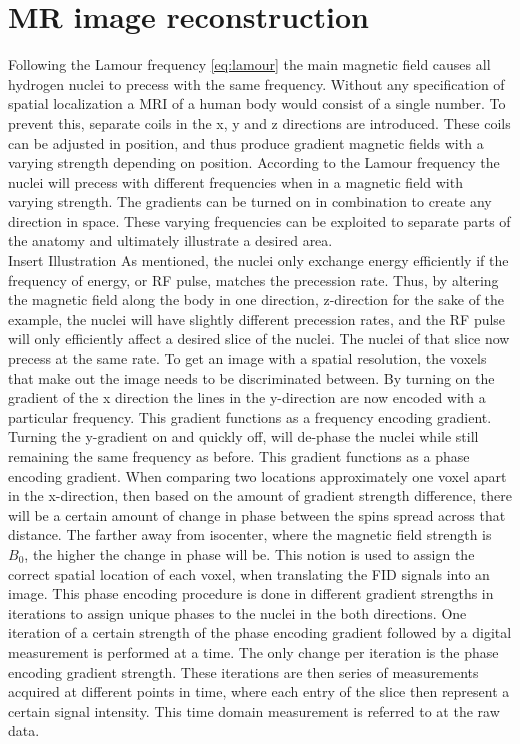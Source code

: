 \section{MR image reconstruction}
Following the Lamour frequency \eqref{eq:lamour} the main magnetic field causes all hydrogen nuclei to precess with the same frequency. Without any specification of spatial localization a MRI of a human body would consist of a single number. To prevent this, separate coils in the x, y and z directions are introduced. These coils can be adjusted in position, and thus produce gradient magnetic fields with a varying strength depending on position. According to the Lamour frequency the nuclei will precess with different frequencies when in a magnetic field with varying strength. The gradients can be turned on in combination to create any direction in space. These varying frequencies can be exploited to separate parts of the anatomy and ultimately illustrate a desired area.\cite{Bharath2008}\\ {\Large Insert Illustration}
As mentioned, the nuclei only exchange energy efficiently if the frequency of energy, or RF pulse, matches the precession rate. Thus, by altering the magnetic field along the body in one direction, z-direction for the sake of the example, the nuclei will have slightly different precession rates, and the RF pulse will only efficiently affect a desired slice of the nuclei.
The nuclei of that slice now precess at the same rate. To get an image with a spatial resolution, the voxels that make out the image needs to be discriminated between. By turning on the gradient of the x direction the lines in the y-direction are now encoded with a particular frequency. This gradient functions as a frequency encoding gradient.\cite{Bharath2008} \\
Turning the y-gradient on and quickly off, will de-phase the nuclei while still remaining the same frequency as before. This gradient functions as a phase encoding gradient. When comparing two locations approximately one voxel apart in the x-direction, then based on the amount of gradient strength difference, there will be a certain amount of change in phase between the spins spread across that distance. The farther away from isocenter, where the magnetic field strength is $B_0$, the higher the change in phase will be. This notion is used to assign the correct spatial location of each voxel, when translating the FID signals into an image. This phase encoding procedure is done in different gradient strengths in iterations to assign unique phases to the nuclei in the both directions. One iteration of a certain strength of the phase encoding gradient followed by a digital measurement is performed at a time. The only change per iteration is the phase encoding gradient strength. These iterations are then series of measurements acquired at different points in time, where each entry of the slice then represent a certain signal intensity. This time domain measurement is referred to at the raw data.\cite{Bharath2008}\\
